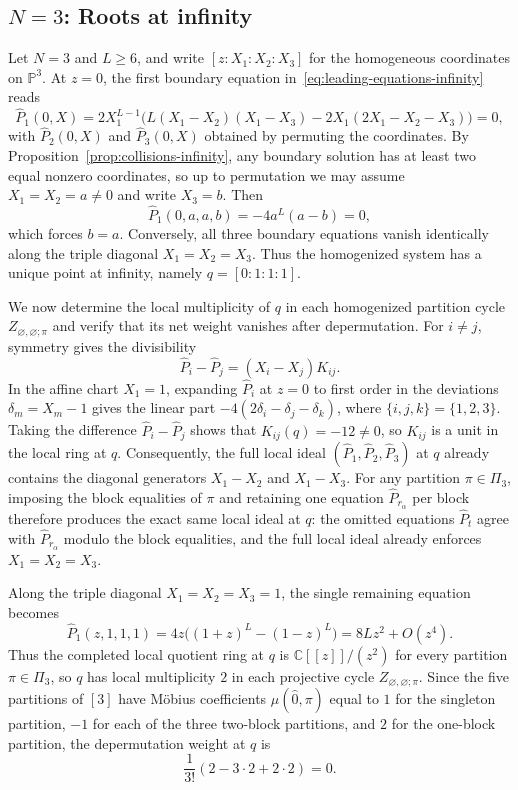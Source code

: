 \documentclass[11pt]{article}
\theoremstyle{definition}
\newcommand{\C}{\mathbb{C}}
\begin{document}
\subsection{\texorpdfstring{$N=3$}{N=3}: Roots at infinity}

Let $N=3$ and $L\ge 6$, and write $[z:X_1:X_2:X_3]$ for the homogeneous
coordinates on $\mathbb{P}^3$. At $z=0$, the first boundary equation in~\eqref{eq:leading-equations-infinity} reads
\[
 \widehat{P}_1(0,X)=2X_1^{L-1}\bigl(
 L(X_1-X_2)(X_1-X_3)-2X_1(2X_1-X_2-X_3)\bigr)=0,
\]
with $\widehat{P}_2(0,X)$ and $\widehat{P}_3(0,X)$ obtained by permuting the coordinates. By
Proposition~\ref{prop:collisions-infinity}, any boundary solution has at least two equal nonzero coordinates, so up to permutation we may assume
$X_1=X_2=a\ne 0$ and write $X_3=b$. Then
\[
 \widehat{P}_1(0,a,a,b)=-4a^L(a-b)=0,
\]
which forces $b=a$. Conversely, all three boundary equations vanish identically along the triple diagonal $X_1=X_2=X_3$. Thus the homogenized system has a unique point at
infinity, namely $q=[0:1:1:1]$.

We now determine the local multiplicity of $q$ in each homogenized partition cycle $Z_{\varnothing,\varnothing;\pi}$ and verify that its net weight vanishes after depermutation.
For $i\ne j$, symmetry gives the divisibility
\[
 \widehat{P}_i-\widehat{P}_j=(X_i-X_j)K_{ij}.
\]
In the affine chart $X_1=1$, expanding $\widehat{P}_i$ at $z=0$ to first order in the deviations
$\delta_m=X_m-1$ gives the linear part $-4(2\delta_i-\delta_j-\delta_k)$, where
$\{i,j,k\}=\{1,2,3\}$. Taking the difference $\widehat{P}_i-\widehat{P}_j$ shows that $K_{ij}(q)=-12\ne 0$,
so $K_{ij}$ is a unit in the local ring at $q$.
Consequently, the full local ideal $(\widehat{P}_1,\widehat{P}_2,\widehat{P}_3)$ at $q$ already contains the diagonal generators $X_1-X_2$ and $X_1-X_3$. For any partition
$\pi\in\Pi_3$, imposing the block equalities of $\pi$ and retaining one equation $\widehat{P}_{r_\alpha}$ per
block therefore produces the exact same local ideal at $q$: the omitted equations $\widehat{P}_t$ agree
with $\widehat{P}_{r_\alpha}$ modulo the block equalities, and the
full local ideal already enforces $X_1=X_2=X_3$.

Along the triple diagonal $X_1=X_2=X_3=1$, the single remaining equation becomes
\[
 \widehat{P}_1(z,1,1,1)
 =4z\bigl((1+z)^L-(1-z)^L\bigr)
 =8Lz^2+O(z^4).
\]
Thus the completed local quotient ring at $q$ is $\C[[z]]/(z^2)$ for every
partition $\pi\in\Pi_3$, so $q$ has local multiplicity $2$ in each projective cycle
$Z_{\varnothing,\varnothing;\pi}$. Since the five
partitions of $[3]$ have M\"obius coefficients $\mu(\hat{0},\pi)$ equal to $1$ for the singleton
partition, $-1$ for each of the three two-block partitions, and $2$
for the one-block partition, the depermutation weight at $q$ is
\[
 \frac{1}{3!}(2-3\cdot 2+2\cdot 2)=0.
\]
\end{document}

